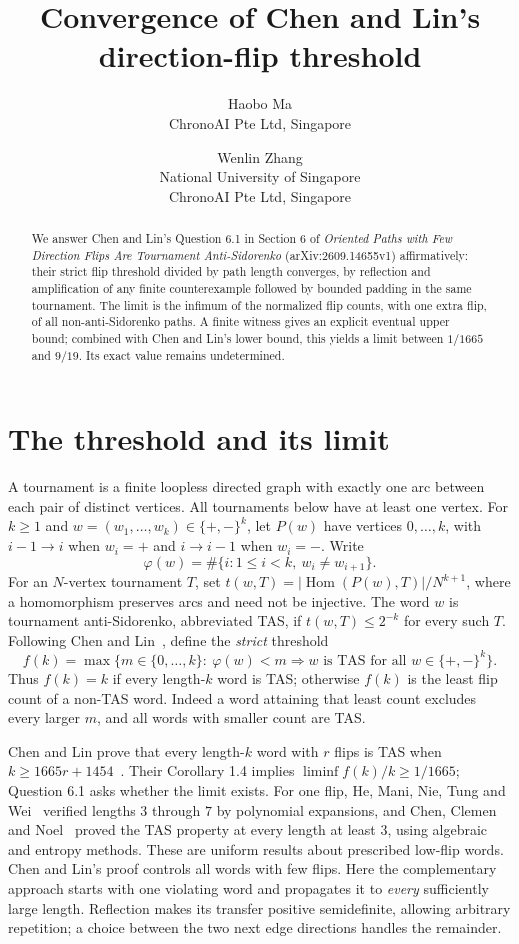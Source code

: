 \documentclass[11pt]{article}
\title{Convergence of Chen and Lin's direction-flip threshold}
\author{Haobo Ma\\\small ChronoAI Pte Ltd, Singapore
\and Wenlin Zhang\\\small National University of Singapore\\\small ChronoAI Pte Ltd, Singapore}
\date{}
\DeclareMathOperator{\Hom}{Hom}
\newcommand{\ph}{\varphi}
\begin{document}
\maketitle
\begin{abstract}
We answer Chen and Lin's Question 6.1 in Section 6 of
\emph{Oriented Paths with Few Direction Flips Are Tournament Anti-Sidorenko}
(arXiv:2609.14655v1) affirmatively: their strict flip threshold divided by
path length converges, by reflection and amplification of any finite
counterexample followed by bounded padding in the same tournament.
The limit is the infimum of the normalized flip counts, with one extra flip,
of all non-anti-Sidorenko paths. A finite witness gives an explicit eventual
upper bound; combined with Chen and Lin's lower bound, this yields a limit
between $1/1665$ and $9/19$. Its exact value remains undetermined.
\end{abstract}

\section{The threshold and its limit}
A tournament is a finite loopless directed graph with exactly one arc between
each pair of distinct vertices. All tournaments below have at least one vertex.
For $k\geq1$ and $w=(w_1,\ldots,w_k)\in\{+,-\}^k$, let $P(w)$ have vertices
$0,\ldots,k$, with $i-1\to i$ when $w_i=+$ and $i\to i-1$ when $w_i=-$.
Write
\[
 \ph(w)=\#\{i:1\leq i<k,\ w_i\ne w_{i+1}\}.
\]
For an $N$-vertex tournament $T$, set
$t(w,T)=|\Hom(P(w),T)|/N^{k+1}$, where a homomorphism preserves arcs
and need not be injective. The word $w$ is tournament anti-Sidorenko,
abbreviated TAS, if $t(w,T)\leq2^{-k}$ for every such $T$.
Following Chen and Lin~\cite{CL}, define the \emph{strict} threshold
\begin{equation}\label{eq:threshold}
 f(k)=\max\{m\in\{0,\ldots,k\}:\ \ph(w)<m\Longrightarrow w\text{ is TAS
 for all }w\in\{+,-\}^k\}.
\end{equation}
Thus $f(k)=k$ if every length-$k$ word is TAS; otherwise $f(k)$ is the
least flip count of a non-TAS word. Indeed a word attaining that least count
excludes every larger $m$, and all words with smaller count are TAS.

Chen and Lin prove that every length-$k$ word with $r$ flips is TAS when
$k\geq1665r+1454$~\cite[Theorem 1.3]{CL}. Their Corollary 1.4 implies
$\liminf f(k)/k\geq1/1665$; Question 6.1 asks whether the limit exists.
For one flip, He, Mani, Nie, Tung and Wei~\cite[Proposition 2.4]{HMNTW} verified lengths
$3$ through $7$ by polynomial expansions, and Chen, Clemen and Noel~\cite[Theorem 1.4]{CCN}
proved the TAS property at every length at least $3$, using algebraic and
entropy methods. These are uniform results about prescribed low-flip words.
Chen and Lin's proof controls all words with few flips. Here the complementary
approach starts with one violating word and propagates it to \emph{every}
sufficiently large length. Reflection makes its transfer positive
semidefinite, allowing arbitrary repetition; a choice between the two next
edge directions handles the remainder.
\end{document}
